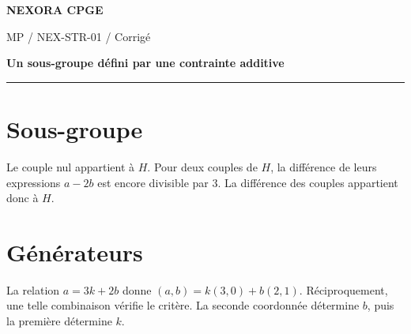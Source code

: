 \documentclass[11pt,a4paper]{article}
\begin{document}
{\small\bfseries\color{nexorablue} NEXORA CPGE}\par
{\small MP / NEX-STR-01 / Corrigé}\par
{\LARGE\bfseries Un sous-groupe défini par une contrainte additive}\par
\vspace{0.25em}\hrule\vspace{0.6em}

\section*{Sous-groupe}
Le couple nul appartient à $H$. Pour deux couples de $H$, la différence de leurs expressions $a-2b$ est encore divisible par $3$. La différence des couples appartient donc à $H$.

\section*{Générateurs}
La relation $a=3k+2b$ donne $(a,b)=k(3,0)+b(2,1)$. Réciproquement, une telle combinaison vérifie le critère. La seconde coordonnée détermine $b$, puis la première détermine $k$.
\end{document}
